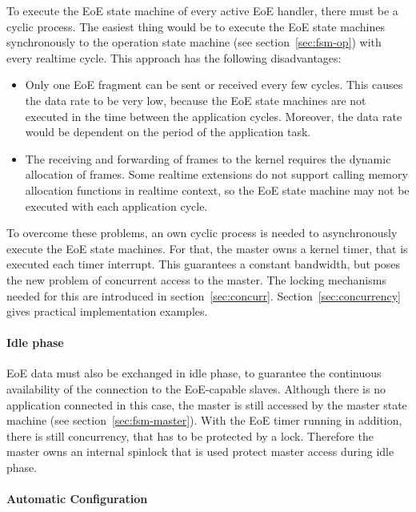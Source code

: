 \documentclass[a4paper,12pt,BCOR6mm,bibtotoc,idxtotoc]{scrbook}
\begin{document}
To execute the EoE state machine of every active EoE handler, there
must be a cyclic process. The easiest thing would be to execute the
EoE state machines synchronously to the operation state machine (see
section~\ref{sec:fsm-op}) with every realtime cycle. This approach has
the following disadvantages:

\begin{itemize}

\item Only one EoE fragment can be sent or received every few cycles.  This
causes the data rate to be very low, because the EoE state machines are not
executed in the time between the application cycles. Moreover, the data rate
would be dependent on the period of the application task.

\item The receiving and forwarding of frames to the kernel requires the dynamic
allocation of frames. Some realtime extensions do not support calling memory
allocation functions in realtime context, so the EoE state machine may not be
executed with each application cycle.

\end{itemize}

To overcome these problems, an own cyclic process is needed to
asynchronously execute the EoE state machines. For that, the master
owns a kernel timer, that is executed each timer interrupt. This
guarantees a constant bandwidth, but poses the new problem of
concurrent access to the master. The locking mechanisms needed for
this are introduced in section~\ref{sec:concurr}.
Section~\ref{sec:concurrency} gives practical implementation examples.

\paragraph{Idle phase}

EoE data must also be exchanged in idle phase, to guarantee the continuous
availability of the connection to the EoE-capable slaves. Although there is no
application connected in this case, the master is still accessed by the master
state machine (see section~\ref{sec:fsm-master}). With the EoE timer running in
addition, there is still concurrency, that has to be protected by a lock.
Therefore the master owns an internal spinlock that is used protect master
access during idle phase.

\paragraph{Automatic Configuration}
\end{document}
